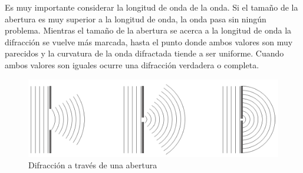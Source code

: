Es muy importante considerar la longitud de onda de la onda. Si el tamaño de la abertura es muy superior a la longitud de onda, la onda pasa sin ningún problema. Mientras el tamaño de la abertura se acerca a la longitud de onda la difracción se vuelve más marcada, hasta el punto donde ambos valores son muy parecidos y la curvatura de la onda difractada tiende a ser uniforme. Cuando ambos valores son iguales ocurre una difracción verdadera o completa.

\begin{figure}[H]
  \centering
  \includegraphics{imagenes/difraccion_atraves.png}
  \caption{Difracción a través de una abertura\cite{xmpdiffraction}}
\end{figure}
